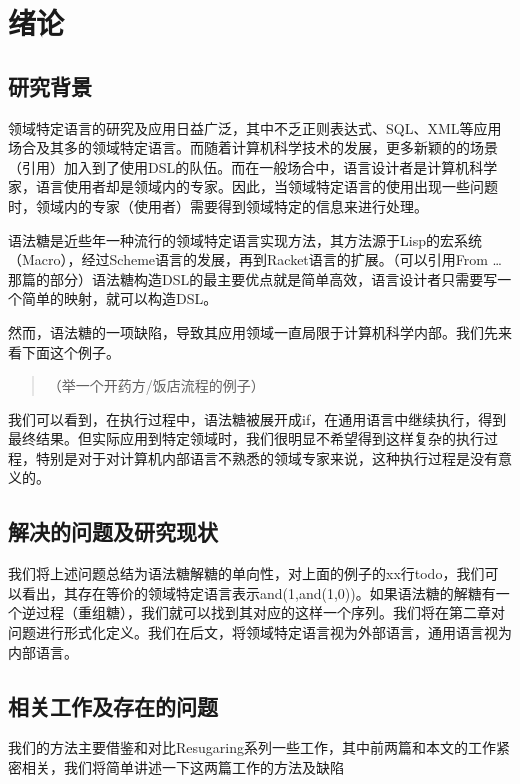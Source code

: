 \pagestyle{fancy}
\normalsize
\linespread{1.5}\selectfont
\chapter{绪论}

\section{研究背景}
领域特定语言的研究及应用日益广泛，其中不乏正则表达式、SQL、XML等应用场合及其多的领域特定语言。而随着计算机科学技术的发展，更多新颖的的场景（引用）加入到了使用DSL的队伍。而在一般场合中，语言设计者是计算机科学家，语言使用者却是领域内的专家。因此，当领域特定语言的使用出现一些问题时，领域内的专家（使用者）需要得到领域特定的信息来进行处理。

语法糖是近些年一种流行的领域特定语言实现方法，其方法源于Lisp的宏系统（Macro），经过Scheme语言的发展，再到Racket语言的扩展。（可以引用From …那篇的部分）语法糖构造DSL的最主要优点就是简单高效，语言设计者只需要写一个简单的映射，就可以构造DSL。

然而，语法糖的一项缺陷，导致其应用领域一直局限于计算机科学内部。我们先来看下面这个例子。
\begin{quote}
	（举一个开药方/饭店流程的例子）
\end{quote}


我们可以看到，在执行过程中，语法糖被展开成if，在通用语言中继续执行，得到最终结果。但实际应用到特定领域时，我们很明显不希望得到这样复杂的执行过程，特别是对于对计算机内部语言不熟悉的领域专家来说，这种执行过程是没有意义的。

\section{解决的问题及研究现状}
我们将上述问题总结为语法糖解糖的单向性，对上面的例子的xx行todo，我们可以看出，其存在等价的领域特定语言表示and(1,and(1,0))。如果语法糖的解糖有一个逆过程（重组糖），我们就可以找到其对应的这样一个序列。我们将在第二章对问题进行形式化定义。我们在后文，将领域特定语言视为外部语言，通用语言视为内部语言。

\section{相关工作及存在的问题}
我们的方法主要借鉴和对比Resugaring系列一些工作，其中前两篇和本文的工作紧密相关，我们将简单讲述一下这两篇工作的方法及缺陷

